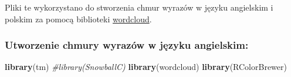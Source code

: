 \documentclass[
  12pt,
]{article}
\newenvironment{Shaded}{\begin{snugshade}}{\end{snugshade}}
\newcommand{\CommentTok}[1]{\textcolor[rgb]{0.56,0.35,0.01}{\textit{#1}}}
\newcommand{\FunctionTok}[1]{\textcolor[rgb]{0.13,0.29,0.53}{\textbf{#1}}}
\newcommand{\NormalTok}[1]{#1}
\begin{document}
Pliki te wykorzystano do stworzenia chmur wyrazów w języku angielskim i
polskim za pomocą biblioteki
\href{https://cran.r-project.org/web/packages/wordcloud/index.html}{wordcloud}.

\hypertarget{utworzenie-chmury-wyrazuxf3w-w-jux119zyku-angielskim}{%
\subsubsection{Utworzenie chmury wyrazów w języku
angielskim:}\label{utworzenie-chmury-wyrazuxf3w-w-jux119zyku-angielskim}}

\begin{Shaded}
\begin{Highlighting}[]
\FunctionTok{library}\NormalTok{(tm)}
\CommentTok{\#library(SnowballC)}
\FunctionTok{library}\NormalTok{(wordcloud)}
\FunctionTok{library}\NormalTok{(RColorBrewer)}


\end{Highlighting}
\end{Shaded}
\end{document}
